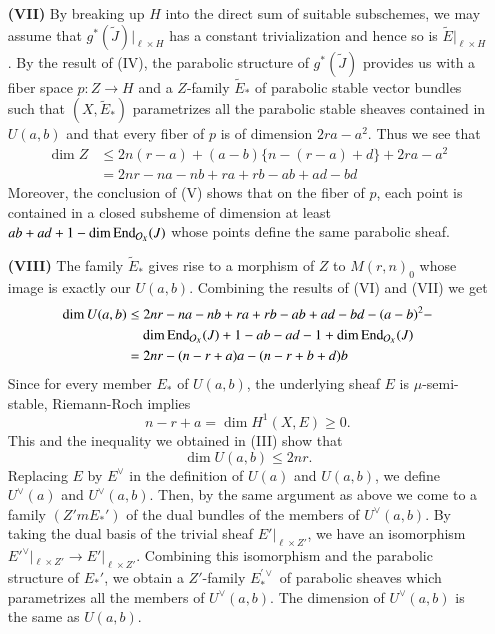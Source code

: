 \begin{itemize}
\item[\bf(VII)] By breaking up $H$ into the direct sum of suitable subschemes, we may assume that $g^{*}(\tilde{J})|_{\ell \times H}$ has a constant trivialization and hence so is $\tilde{E}|_{\ell\times H}$.
By the result of (IV), the parabolic structure of $g^{*}(\tilde{J})$ provides us with a fiber space $p : Z \rightarrow H$ and a $Z$-family $\tilde{E}_{*}$ of parabolic stable vector bundles such that $(X, \tilde{E}_{*})$ parametrizes all the parabolic stable sheaves contained in $U(a, b)$ and that every fiber of $p$ is of dimension $2ra-a^{2}$. Thus we see that
\begin{align*}
\dim Z &\leq 2n(r-a) + (a-b) \{n -(r-a) + d\} + 2ra-a^{2}\\
 &= 2nr-na -nb +ra +rb -ab + ad-bd
\end{align*}
 Moreover, the conclusion of (V) shows that on the fiber of $p$, each point is contained in a closed subsheme of dimension at least $ab + ad + 1-\dim \operatorname{End}_{\mathcal{O}_{X}}(J)$ whose points define the same parabolic sheaf.

\item[\bf(VIII)] The family $\tilde{E}_{*}$ gives rise to a morphism of $Z$ to $M(r, n)_{0}$ whose image is exactly our $U(a,b)$. Combining the results of (VI) and (VII) we get
\begin{equation*}
\begin{split}
\dim U(a, b) &\leq 2nr -na -nb + ra + rb -ab +ad-bd-(a-b)^{2}-\\
             & \quad \dim \operatorname{End}_{\mathcal{O}_{X}}(J) + 1 -ab -ad -1 + \dim \operatorname{End}_{\mathcal{O}_{X}}(J)\\
             &= 2nr -(n-r +a)a-(n-r +b + d)b 
\end{split}
\end{equation*}
Since for every member $E_{*}$ of $U(a, b)$, the underlying sheaf $E$ is $\mu$-semi-stable, Riemann-Roch implies
$$
n-r + a = \dim H^{1}(X, E) \geq 0.
$$
This and the inequality we obtained in (III) show that
$$
\dim U(a, b) \leq 2nr.
$$
Replacing $E$ by $E^{\vee}$ in the definition of $U(a)$ and $U(a, b)$, we  define $U^{\vee}(a)$ and $U^{\vee}(a, b)$. Then, by the same argument as above we come to a family $(Z'm E_{*}')$ of the dual bundles of the members of $U^{\vee}(a, b)$. By taking the dual basis of the trivial sheaf $E'|_{\ell \times Z'}$, we have an isomorphism $E'^{\vee}|_{\ell \times Z'} \rightarrow E'|_{\ell \times Z'}$. Combining this isomorphism and the parabolic structure of $E_{*}'$, we obtain a $Z'$-family $E_{*}^{'\vee}$ of parabolic sheaves which parametrizes all the members of $U^{\vee}(a, b)$. The dimension of $U^{\vee}(a, b)$ is the same as $U(a, b)$.


\end{itemize}
